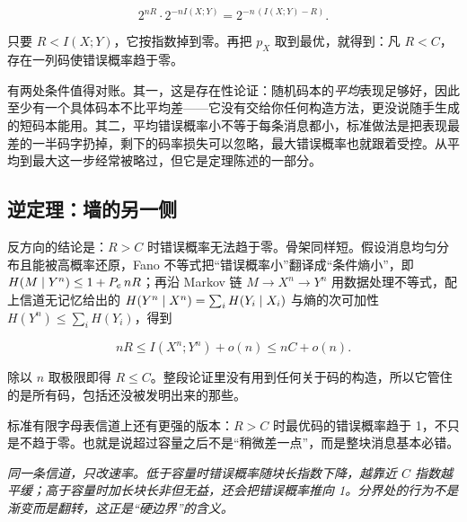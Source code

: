 \[
2^{nR}\cdot 2^{-nI(X;Y)}=2^{-n\,(I(X;Y)-R)}.
\]

只要 \(R<I(X;Y)\)，它按指数掉到零。再把 \(p_X\) 取到最优，就得到：凡 \(R<C\)，存在一列码使错误概率趋于零。

有两处条件值得对账。其一，这是存在性论证：随机码本的\emph{平均}表现足够好，因此至少有一个具体码本不比平均差——它没有交给你任何构造方法，更没说随手生成的短码本能用。其二，平均错误概率小不等于每条消息都小，标准做法是把表现最差的一半码字扔掉，剩下的码率损失可以忽略，最大错误概率也就跟着受控。从平均到最大这一步经常被略过，但它是定理陈述的一部分。

\subsection{逆定理：墙的另一侧}

反方向的结论是：\(R>C\) 时错误概率无法趋于零。骨架同样短。假设消息均匀分布且能被高概率还原，Fano 不等式把``错误概率小''翻译成``条件熵小''，即 \(H(M\mid Y^n)\le1+P_e\,nR\)；再沿 Markov 链 \(M\to X^n\to Y^n\) 用数据处理不等式，配上信道无记忆给出的 \(H(Y^n\mid X^n)=\sum_i H(Y_i\mid X_i)\) 与熵的次可加性 \(H(Y^n)\le\sum_i H(Y_i)\)，得到

\[
nR\le I(X^n;Y^n)+o(n)\le nC+o(n).
\]

除以 \(n\) 取极限即得 \(R\le C\)。整段论证里没有用到任何关于码的构造，所以它管住的是所有码，包括还没被发明出来的那些。

标准有限字母表信道上还有更强的版本：\(R>C\) 时最优码的错误概率趋于 1，不只是不趋于零。也就是说超过容量之后不是``稍微差一点''，而是整块消息基本必错。

\begin{center}

\emph{同一条信道，只改速率。低于容量时错误概率随块长指数下降，越靠近 \(C\) 指数越平缓；高于容量时加长块长非但无益，还会把错误概率推向 1。分界处的行为不是渐变而是翻转，这正是``硬边界''的含义。}
\end{center}

